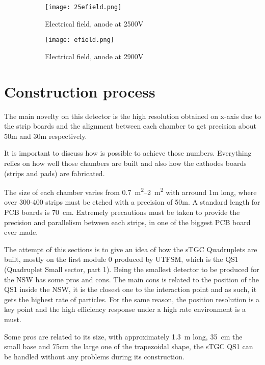 \begin{figure}[ht]
		\centering
		\hspace*{\fill}
		\begin{subfigure}[b]{0.45\textwidth}
			\centering
			\texttt{[image: 25efield.png]}
			\caption{Electrical field, anode at 2500V}\label{fig:25efield}
		\end{subfigure}
		\hfill
		\begin{subfigure}[b]{0.45\textwidth}
			\centering
			\texttt{[image: efield.png]}
			\caption{Electrical field, anode at 2900V}\label{fig:efield}
		\end{subfigure}
		\hspace*{\fill}
		\caption{}\label{}
\end{figure}


\section{Construction process}

The main novelty on this detector is the high resolution obtained on x-axis due to the strip boards and the alignment
between each chamber to get precision about 50\micro m and 30\micro m respectively.\par 
It is important to discuss how
is possible to achieve those numbers. Everything relies on how well those chambers are built and also how the cathodes
boards (strips and pads) are fabricated.\par The size of each chamber varies from \SIrange{0.7}{2}{m^2} with arround 1m long,
where over 300-400 strips must be etched with a precision of 50\micro m. A standard length for PCB boards is \SI{70}{cm}.
Extremely precautions must be taken to provide the precision and parallelism between each strips, in one of the biggest PCB board ever made.\par 
The attempt of this sections is to
give an idea of how the sTGC Quadruplets are built, mostly on the first module 0 produced by UTFSM, which is the QS1
(Quadruplet Small sector, part 1).  Being the smallest detector to be produced for the NSW has some pros and cons. The
main cons is related to the position of the QS1 inside the NSW, it is the closest one to the interaction point and as
such, it gets the highest rate of particles. For the same reason, the position resolution is a key point and
the high efficiency response under a high rate environment is a must.\par
Some pros are related to its size, with approximately \SI{1.3}{m} long, \SI{35}{cm} the small base and 75cm the large one of the trapezoidal shape, the sTGC QS1 can be handled without any
problems during its construction.\par

